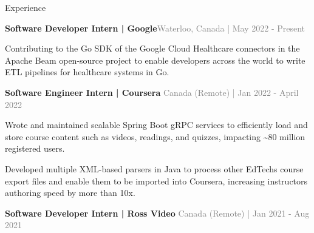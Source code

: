 \documentclass[hidelinks]{resume} %
\begin{document}
\vspace{-.20cm}
\begin{rSection}{Experience}
\vspace{-.1cm}
\begin{rSubsection}{\textbf{Software Developer Intern | Google}}{\textcolor{gray}{\small Waterloo, Canada | May 2022 - Present}}{}
        \par
        \begin{bulletpoints}
            \vspace{-.10cm}
            \item Contributing to the Go SDK of the Google Cloud Healthcare connectors in the Apache Beam open-source project to enable developers across the world to write ETL pipelines for healthcare systems in Go.
             \vspace{-.10cm}
        \end{bulletpoints}
\end{rSubsection}
\begin{rSubsection}{\textbf{Software Engineer Intern | Coursera} }{\textcolor{gray}{\small Canada (Remote) | Jan 2022 - April 2022}}{}

    \begin{bulletpoints}
        \vspace{-.10cm}
        \item Wrote and maintained scalable Spring Boot gRPC services to efficiently load and store course content such as videos, readings, and quizzes, impacting \textasciitilde 80 million registered users.
        \vspace{-.13cm}
        \item Developed multiple XML-based parsers in Java to process other EdTechs course export files and enable them to be imported into Coursera, increasing instructors authoring speed by more than 10x.
        \vspace{-.10cm}
    \end{bulletpoints}
\end{rSubsection}
\begin{rSubsection}{\textbf{Software Developer Intern | Ross Video} }{\textcolor{gray}{\small Canada (Remote) | Jan 2021 - Aug 2021}}{}


\end{rSubsection}
\end{rSection}
\end{document}
